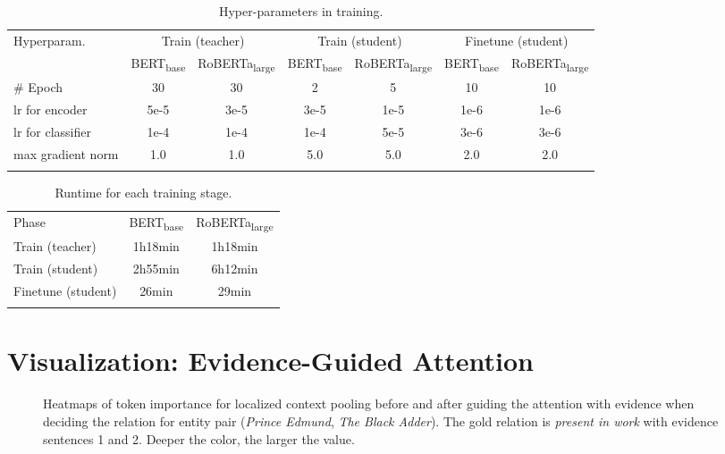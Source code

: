 \documentclass[11pt]{article}
\begin{document}
\begin{table*}[t]
    \centering
    \small
    \begin{tabular}{lcccccc}
    \Xhline{3\arrayrulewidth}
    Hyperparam. & \multicolumn{2}{c}{Train (teacher)} & \multicolumn{2}{c}{Train (student)} & \multicolumn{2}{c}{Finetune (student)} \\
    & BERT\textsubscript{base} & RoBERTa\textsubscript{large} & BERT\textsubscript{base} & RoBERTa\textsubscript{large} & BERT\textsubscript{base} & RoBERTa\textsubscript{large} \\
    \Xhline{3\arrayrulewidth}
         \# Epoch &  30 & 30 & 2 & 5 & 10 & 10 \\
         lr for encoder & 5e-5 & 3e-5 & 3e-5 & 1e-5 & 1e-6 & 1e-6 \\
         lr for classifier & 1e-4 & 1e-4 & 1e-4 & 5e-5 & 3e-6 & 3e-6\\
         max gradient norm & 1.0 & 1.0 & 5.0 & 5.0 & 2.0 & 2.0 \\
    \Xhline{3\arrayrulewidth}
    \end{tabular}
    \caption{Hyper-parameters in training.}
    \label{tab:hyparam}
\end{table*}

\begin{table}[t]
    \centering
    \small
    \begin{tabular}{lcc}
    \Xhline{3\arrayrulewidth}
     Phase & BERT\textsubscript{base} & RoBERTa\textsubscript{large} \\
    \Xhline{3\arrayrulewidth}
Train (teacher) & 1h18min & 1h18min \\
    Train (student) & 2h55min & 6h12min \\
    Finetune (student) & 26min & 29min \\
    \Xhline{3\arrayrulewidth}
    \end{tabular}
    \caption{Runtime for each training stage.}
    \label{tab:time}
\end{table}

\section{Visualization: Evidence-Guided Attention}
\label{sec:visualization}

\begin{figure}[t!]
    \centering
\caption{Heatmaps of token importance for localized context pooling before and after guiding the attention with evidence when deciding the relation for entity pair (\textit{Prince Edmund}, \textit{The Black Adder}). The gold relation is \textit{present in work} with evidence sentences 1 and 2. Deeper the color, the larger the value. }
    \label{fig:heatmap_1}
\end{figure}
\end{document}
